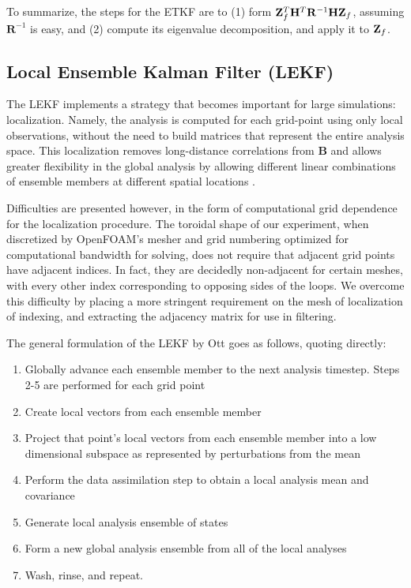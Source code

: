 To summarize, the steps for the ETKF are to (1) form $\mathbf{Z}_f^T\mathbf{H}^T\mathbf{R}^{-1}\mathbf{H}\mathbf{Z}_f$, assuming $\mathbf{R}^{-1}$ is easy, and (2) compute its eigenvalue decomposition, and apply it to $\mathbf{Z}_f$.


\subsection{Local Ensemble Kalman Filter (LEKF)}

The LEKF implements a strategy that becomes important for large simulations: localization.
Namely, the analysis is computed for each grid-point using only local observations, without the need to build matrices that represent the entire analysis space.
This localization removes long-distance correlations from $\mathbf{B}$ and allows greater flexibility in the global analysis by allowing different linear combinations of ensemble members at different spatial locations .

Difficulties are presented however, in the form of computational grid dependence for the localization procedure.
The toroidal shape of our experiment, when discretized by OpenFOAM's mesher and grid numbering optimized for computational bandwidth for solving, does not require that adjacent grid points have adjacent indices.
In fact, they are decidedly non-adjacent for certain meshes, with every other index corresponding to opposing sides of the loops.
We overcome this difficulty by placing a more stringent requirement on the mesh of localization of indexing, and extracting the adjacency matrix for use in filtering.

The general formulation of the LEKF by Ott  goes as follows, quoting directly:
\begin{enumerate}
\item Globally advance each ensemble member to the next analysis timestep. Steps 2-5 are performed for each grid point
\item Create local vectors from each ensemble member
\item Project that point's local vectors from each ensemble member into a low dimensional subspace as represented by perturbations from the mean
\item Perform the data assimilation step to obtain a local analysis mean and covariance
\item Generate local analysis ensemble of states
\item Form a new global analysis ensemble from all of the local analyses
\item Wash, rinse, and repeat.
\end{enumerate}

